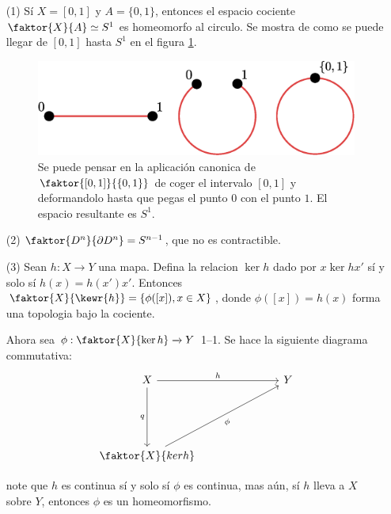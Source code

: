 \begin{example}\label{}
    \begin{enumerate}
        \item[(1)] S\'i $X=[0,1]$ y $A=\{0,1\}$, entonces el espacio cociente
            $\faktor{X}{A} \simeq S^1$ es homeomorfo al circulo. Se mostra de
            como se puede llegar de $[0,1]$ hasta $S^1$ en el figura \ref{fig_19}.

        \begin{figure}[h]
            \centering
            \includegraphics[scale=0.5]{Figures/interval_to_circle.eps}
            \caption{Se puede pensar en la aplicaci\'on canonica de
                $\faktor{[0,1]}{\{0,1\}}$ de coger el intervalo $[0,1]$ y
            deformandolo hasta que pegas el punto $0$ con el punto $1$. El espacio
            resultante es $S^1$.}
            \label{fig_19}
        \end{figure}
        \item[(2)] $\faktor{D^n}{\partial{D^n}}=S^{n-1}$, que no es
            contractible.

        \item[(3)] Sean $h:X \xrightarrow{} Y$ una mapa. Defina la relacion
            $\ker{h}$ dado por $x \ker{h} x'$ s\'i y solo s\'i $h(x)=h(x')x'$.
            Entonces $\faktor{X}{\kewr{h}}=\{\phi([x]), x \in X\}$, donde
            $\phi([x])=h(x)$ forma una topologia bajo la cociente.

            Ahora sea $\phi:\faktor{X}{\ker{h}} \xrightarrow{} Y$ 1--1. Se hace
            la siguiente diagrama commutativa:
            \[\begin{tikzcd}
                X &&& Y \\
                \\
                \\
                {\faktor{X}{ker{h}}}
                \arrow["h", from=1-1, to=1-4]
                \arrow["q"', from=1-1, to=4-1]
                \arrow["\phi"', from=4-1, to=1-4]
            \end{tikzcd}\]

            note que $h$ es continua s\'i y solo s\'i  $\phi$ es continua, mas
            a\'un, s\'i  $h$ lleva a $X$ sobre  $Y$, entonces $\phi$ es un
            homeomorfismo.
    \end{enumerate}
\end{example}


